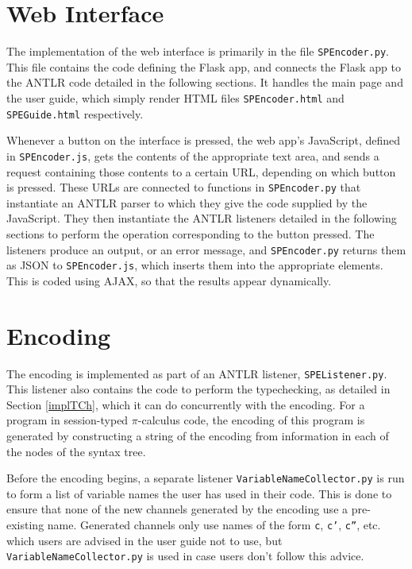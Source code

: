 \documentclass{l4proj}
\begin{document}
\section{Web Interface}
\label{implInterface}

\quad The implementation of the web interface is primarily in the file \texttt{SPEncoder.py}. This file contains the code defining the Flask app, and connects the Flask app to the ANTLR code detailed in the following sections. It handles the main page and the user guide, which simply render HTML files \texttt{SPEncoder.html} and \texttt{SPEGuide.html} respectively.

\quad Whenever a button on the interface is pressed, the web app's JavaScript, defined in \texttt{SPEncoder.js}, gets the contents of the appropriate text area, and sends a request containing those contents to a certain URL, depending on which button is pressed. These URLs are connected to functions in \texttt{SPEncoder.py} that instantiate an ANTLR parser to which they give the code supplied by the JavaScript. They then instantiate the ANTLR listeners detailed in the following sections to perform the operation corresponding to the button pressed. The listeners produce an output, or an error message, and \texttt{SPEncoder.py} returns them as JSON to \texttt{SPEncoder.js}, which inserts them into the appropriate elements. This is coded using AJAX, so that the results appear dynamically.

\section{Encoding}
\label{implEncode}

\quad The encoding is implemented as part of an ANTLR listener, \texttt{SPEListener.py}. This listener also contains the code to perform the typechecking, as detailed in Section \ref{implTCh}, which it can do concurrently with the encoding. For a program in session-typed $\pi$-calculus code, the encoding of this program is generated by constructing a string of the encoding from information in each of the nodes of the syntax tree.

\quad Before the encoding begins, a separate listener \texttt{VariableNameCollector.py} is run to form a list of variable names the user has used in their code. This is done to ensure that none of the new channels generated by the encoding use a pre-existing name. Generated channels only use names of the form \texttt{c}, \texttt{c'}, \texttt{c''}, etc. which users are advised in the user guide not to use, but \texttt{VariableNameCollector.py} is used in case users don't follow this advice.
\end{document}
